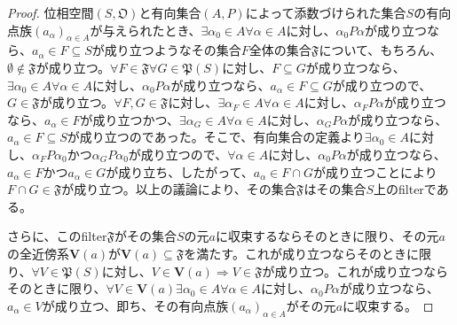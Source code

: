 \documentclass[dvipdfmx]{jsarticle}
\begin{document}
\begin{proof}
位相空間$\left( S,\mathfrak{O} \right)$と有向集合$(A,P)$によって添数づけられた集合$S$の有向点族$\left( a_{\alpha} \right)_{\alpha \in A}$が与えられたとき、$\exists\alpha_{0} \in A\forall\alpha \in A$に対し、$\alpha_{0}P\alpha$が成り立つなら、$a_{\alpha} \in F \subseteq S$が成り立つようなその集合$F$全体の集合$\mathfrak{F}$について、もちろん、$\mathfrak{\emptyset \notin F}$が成り立つ。$\forall F \in \mathfrak{F\forall}G \in \mathfrak{P}(S)$に対し、$F \subseteq G$が成り立つなら、$\exists\alpha_{0} \in A\forall\alpha \in A$に対し、$\alpha_{0}P\alpha$が成り立つなら、$a_{\alpha} \in F \subseteq G$が成り立つので、$G\in \mathfrak{F}$が成り立つ。$\forall F,G \in \mathfrak{F}$に対し、$\exists\alpha_{F} \in A\forall\alpha \in A$に対し、$\alpha_{F}P\alpha$が成り立つなら、$a_{\alpha} \in F$が成り立つかつ、$\exists\alpha_{G} \in A\forall\alpha \in A$に対し、$\alpha_{G}P\alpha$が成り立つなら、$a_{\alpha} \in F \subseteq S$が成り立つのであった。そこで、有向集合の定義より$\exists\alpha_{0} \in A$に対し、$\alpha_{F}P\alpha_{0}$かつ$\alpha_{G}P\alpha_{0}$が成り立つので、$\forall\alpha \in A$に対し、$\alpha_{0}P\alpha$が成り立つなら、$a_{\alpha} \in F$かつ$a_{\alpha} \in G$が成り立ち、したがって、$a_{\alpha} \in F \cap G$が成り立つことにより$F \cap G \in \mathfrak{F}$が成り立つ。以上の議論により、その集合$\mathfrak{F}$はその集合$S$上のfilterである。\par
さらに、このfilter$\mathfrak{F}$がその集合$S$の元$a$に収束するならそのときに限り、その元$a$の全近傍系$\mathbf{V}(a)$が$\mathbf{V}(a)\subseteq \mathfrak{F}$を満たす。これが成り立つならそのときに限り、$\forall V \in \mathfrak{P}(S)$に対し、$V \in \mathbf{V}(a) \Rightarrow V \in \mathfrak{F}$が成り立つ。これが成り立つならそのときに限り、$\forall V \in \mathbf{V}(a)\exists\alpha_{0} \in A\forall\alpha \in A$に対し、$\alpha_{0}P\alpha$が成り立つなら、$a_{\alpha} \in V$が成り立つ、即ち、その有向点族$\left( a_{\alpha} \right)_{\alpha \in A}$がその元$a$に収束する。
\end{proof}
\end{document}
